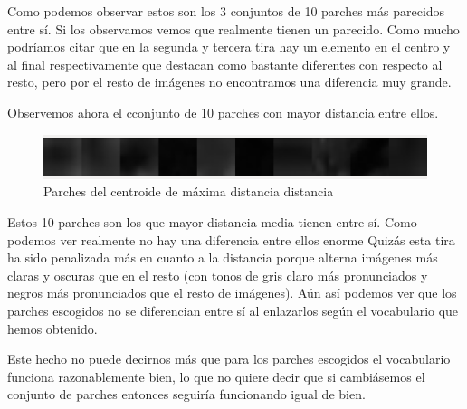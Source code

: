 \documentclass[12pt,a4paper]{article}
\begin{document}
Como podemos observar estos son los 3 conjuntos de 10 parches más parecidos entre sí. Si los observamos vemos que realmente tienen un parecido. Como mucho podríamos citar que en la segunda y tercera tira hay un elemento en el centro y al final respectivamente que destacan como bastante diferentes con respecto al resto, pero por el resto de imágenes no encontramos una diferencia muy grande.

\vspace{10px}

Observemos ahora el cconjunto de 10 parches con mayor distancia entre ellos.

\begin{figure}[H]
  \centering
  \includegraphics[scale=1.1]{./Imagenes/Ejercicio3-4.png}
  \caption{Parches del centroide de máxima distancia distancia}
	\label{Ejercicio3-4}
\end{figure}

Estos 10 parches son los que mayor distancia media tienen entre sí. Como podemos ver realmente no hay una diferencia entre ellos enorme Quizás esta tira ha sido penalizada más en cuanto a la distancia porque alterna imágenes más claras y oscuras que en el resto (con tonos de gris claro más pronunciados y negros más pronunciados que el resto de imágenes). Aún así podemos ver que los parches escogidos no se diferencian entre sí al enlazarlos según el vocabulario que hemos obtenido.

\vspace{10px}

Este hecho no puede decirnos más que para los parches escogidos el vocabulario funciona razonablemente bien, lo que no quiere decir que si cambiásemos el conjunto de parches entonces seguiría funcionando igual de bien.
\end{document}
